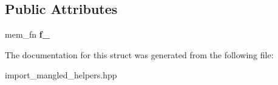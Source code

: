 \subsection*{Public Attributes}
\begin{DoxyCompactItemize}
\item 
mem\+\_\+fn {\bfseries f\+\_\+}\hypertarget{a00222_afb9e2f791ab45abe26b4053a9da00b6c}{}\label{a00222_afb9e2f791ab45abe26b4053a9da00b6c}

\end{DoxyCompactItemize}


The documentation for this struct was generated from the following file\+:\begin{DoxyCompactItemize}
\item 
import\+\_\+mangled\+\_\+helpers.\+hpp\end{DoxyCompactItemize}
